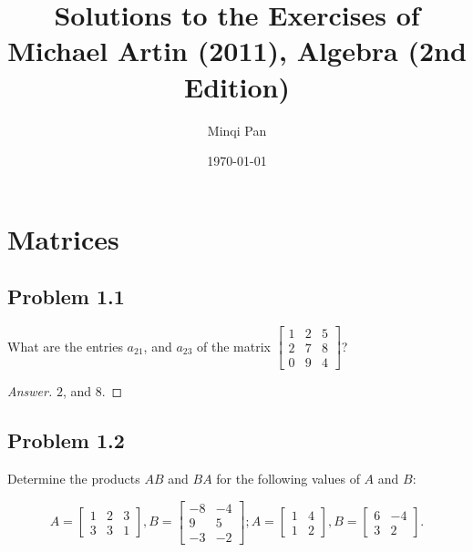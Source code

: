 \documentclass{amsbook}
\theoremstyle{definition}
\theoremstyle{remark}
\numberwithin{section}{chapter}
\numberwithin{equation}{chapter}
\begin{document}
\frontmatter

\title{Solutions to the Exercises of Michael Artin (2011), Algebra (2nd Edition)}

\author{Minqi Pan}

\date{\today}

\maketitle

\setcounter{page}{4}

\tableofcontents

\mainmatter

\chapter{Matrices}

\section{Problem 1.1}

What are the entries $a_{21}$, and $a_{23}$ of the matrix $\begin{bmatrix}
1 & 2 & 5\\
2 & 7 & 8\\
0 & 9 & 4
\end{bmatrix}$?

\begin{proof}[Answer]
$2$, and $8$.
\end{proof}

\section{Problem 1.2}

Determine the products $AB$ and $BA$ for the following values of $A$ and $B$:

\[ A=\begin{bmatrix}
1&2&3\\
3&3&1
\end{bmatrix}, B=\begin{bmatrix}
-8 & -4\\
9  & 5\\
-3 & -2\end{bmatrix}; A=\begin{bmatrix}
1&4\\
1&2\end{bmatrix}, B=\begin{bmatrix}
6 & -4\\
3 & 2\end{bmatrix}. \]
\end{document}
